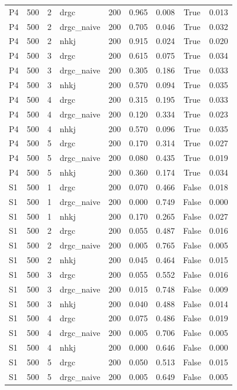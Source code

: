 \begin{table}[htbp]
\begin{tabular}{lcclccccc}
P4 & 500 & 2 & drgc & 200 & 0.965 & 0.008 & True & 0.013 \\
P4 & 500 & 2 & drgc\_naive & 200 & 0.705 & 0.046 & True & 0.032 \\
P4 & 500 & 2 & nhkj & 200 & 0.915 & 0.024 & True & 0.020 \\
P4 & 500 & 3 & drgc & 200 & 0.615 & 0.075 & True & 0.034 \\
P4 & 500 & 3 & drgc\_naive & 200 & 0.305 & 0.186 & True & 0.033 \\
P4 & 500 & 3 & nhkj & 200 & 0.570 & 0.094 & True & 0.035 \\
P4 & 500 & 4 & drgc & 200 & 0.315 & 0.195 & True & 0.033 \\
P4 & 500 & 4 & drgc\_naive & 200 & 0.120 & 0.334 & True & 0.023 \\
P4 & 500 & 4 & nhkj & 200 & 0.570 & 0.096 & True & 0.035 \\
P4 & 500 & 5 & drgc & 200 & 0.170 & 0.314 & True & 0.027 \\
P4 & 500 & 5 & drgc\_naive & 200 & 0.080 & 0.435 & True & 0.019 \\
P4 & 500 & 5 & nhkj & 200 & 0.360 & 0.174 & True & 0.034 \\
S1 & 500 & 1 & drgc & 200 & 0.070 & 0.466 & False & 0.018 \\
S1 & 500 & 1 & drgc\_naive & 200 & 0.000 & 0.749 & False & 0.000 \\
S1 & 500 & 1 & nhkj & 200 & 0.170 & 0.265 & False & 0.027 \\
S1 & 500 & 2 & drgc & 200 & 0.055 & 0.487 & False & 0.016 \\
S1 & 500 & 2 & drgc\_naive & 200 & 0.005 & 0.765 & False & 0.005 \\
S1 & 500 & 2 & nhkj & 200 & 0.045 & 0.464 & False & 0.015 \\
S1 & 500 & 3 & drgc & 200 & 0.055 & 0.552 & False & 0.016 \\
S1 & 500 & 3 & drgc\_naive & 200 & 0.015 & 0.748 & False & 0.009 \\
S1 & 500 & 3 & nhkj & 200 & 0.040 & 0.488 & False & 0.014 \\
S1 & 500 & 4 & drgc & 200 & 0.075 & 0.486 & False & 0.019 \\
S1 & 500 & 4 & drgc\_naive & 200 & 0.005 & 0.706 & False & 0.005 \\
S1 & 500 & 4 & nhkj & 200 & 0.000 & 0.646 & False & 0.000 \\
S1 & 500 & 5 & drgc & 200 & 0.050 & 0.513 & False & 0.015 \\
S1 & 500 & 5 & drgc\_naive & 200 & 0.005 & 0.649 & False & 0.005 \\

\end{tabular}
\end{table}
